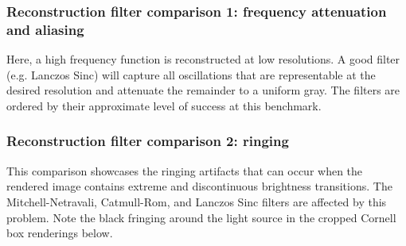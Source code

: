 \newpage
\subsubsection{Reconstruction filter comparison 1: frequency attenuation and aliasing}
\vspace{-2mm}
Here, a high frequency function is reconstructed at low resolutions. A good filter 
(e.g. Lanczos Sinc) will capture all oscillations that are representable at the desired
resolution and attenuate the remainder to a uniform gray. The filters are ordered by their
approximate level of success at this benchmark.
\vspace{-4mm}
\vspace{-4mm}
\newpage
\subsubsection{Reconstruction filter comparison 2: ringing}
This comparison showcases the ringing artifacts that can occur when the rendered 
image contains extreme and discontinuous brightness transitions. The
Mitchell-Netravali, Catmull-Rom, and Lanczos Sinc filters are affected by this problem.
Note the black fringing around the light source in the cropped Cornell box renderings below.
\vspace{-4mm}
\vspace{-4mm}
